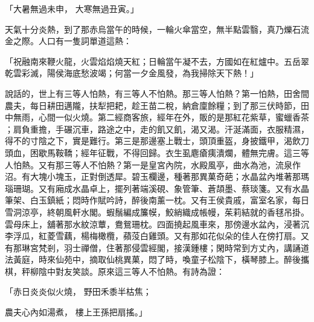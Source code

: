 \begin{showcontents}{}
「大暑無過未申，  大寒無過丑寅。」

天氣十分炎熱，到了那赤烏當午的時候，一輪火傘當空，無半點雲翳，真乃爍石流金之際。人口有一隻詞單道這熱：

「祝融南來鞭火龍，火雲焰焰燒天紅；日輪當午凝不去，方國如在紅爐中。五岳翠乾雲彩滅，陽侯海底愁波竭；何當一夕金風發，為我掃除天下熱！」

說話的，世上有三等人怕熱，有三等人不怕熱。那三等人怕熱？第一怕熱，田舍間農夫，每日耕田邁隴，扶犁把耙，趁王苗二稅，納倉廩餘糧；到了那三伏時節，田中無雨，心間一似火燒。第二經商客旅，經年在外，販的是那紅花紫草，蜜蠟香茶 ；肩負重擔，手碾沉車，路途之中，走的飢又飢，渴又渴。汗涎滿面，衣服精濕，得不的寸陰之下，實是難行。第三是那邊塞上戰士，頭頂重盔，身披鐵甲，渴飲刀頭血，困歇馬鞍鞽；經年征戰，不得回歸。衣生虱麀瘡痍潰爛，體無完膚。這三等人怕熱。又有那三等人不怕熱？第一是皇宮內院，水殿風亭，曲水為池，流泉作沼。有大塊小塊玉，正對倒透犀。碧玉欄邊，種著那異菓奇葩；水晶盆內堆著那瑪瑙珊瑚。又有廂成水晶卓上，擺列著端溪硯、象管筆、蒼頡墨、蔡琰箋。又有水晶筆架、白玉鎮紙；悶時作賦吟詩，醉後南薰一枕。又有王侯貴戚，富室名家，每日雪洞涼亭，終朝風軒水閣。蝦鬚編成簾幙，鮫綃織成帳幔，茱莉結就的香毬吊掛。雲母床上，舖著那水紋涼蕈，鴦鴛珊枕。四面撓起風車來，那傍邊水盆內，浸著沉李浮瓜，紅菱雪藕，楊梅橄欖，蘋莈白雞頭。又有那如花似朵的佳人在傍打扇。又有那琳宮梵剎，羽士禪僧，住著那侵雲經閣，接漢鍾樓；閑時常到方丈內，講誦道法黃庭，時來仙苑中，摘取仙桃異菓，悶了時，喚童子松陰下，橫琴膝上。醉後攜棋，秤柳陰中對友笑談。原來這三等人不怕熱。有詩為證：

「赤日炎炎似火燒，  野田禾黍半枯焦；

農夫心內如湯煮，  樓上王孫把扇搖。」


\end{showcontents}
